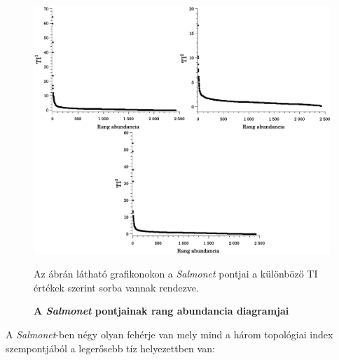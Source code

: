 \documentclass[a4paper,12pt]{article}
\newenvironment{imgdesc}{
		\small
		\singlespacing
		\begin{center}
		
	}{
		\end{center}	
	}
\begin{document}
				\begin{figure}[H]
						\includegraphics[scale=0.44]{img/salmonet_tis.pdf}
						\centering
						\caption{ \textbf{A \textit{Salmonet} pontjainak rang abundancia diagramjai}}
						\begin{imgdesc}
							Az ábrán látható grafikonokon a \textit{Salmonet} pontjai a különböző TI értékek szerint sorba vannak rendezve. 
						\end{imgdesc}
			
						\label{fig:salmonet_stats}			 		 
				\end{figure}
				
			A \textit{Salmonet}-ben négy olyan fehérje van mely mind a három topológiai index szempontjából a legerősebb tíz helyezettben van:
			
\end{document}
